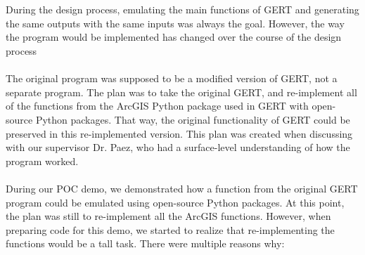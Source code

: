 \documentclass{article}
\begin{document}
\\ \\
During the design process, emulating the main functions of GERT and generating the same outputs with the same inputs was always the goal. However, the way the program would be implemented has changed over the course of the design process
\\ \\
The original program was supposed to be a modified version of GERT, not a separate program. The plan was to take the original GERT, and re-implement all of the functions from the ArcGIS Python package used in GERT with open-source Python packages. That way, the original functionality of GERT could be preserved in this re-implemented version. This plan was created when discussing with our supervisor Dr. Paez, who had a surface-level understanding of how the program worked.
\\ \\
During our POC demo, we demonstrated how a function from the original GERT program could be emulated using open-source Python packages. At this point, the plan was still to re-implement all the ArcGIS functions. However, when preparing code for this demo, we started to realize that re-implementing the functions would be a tall task. There were multiple reasons why: 
\end{document}
